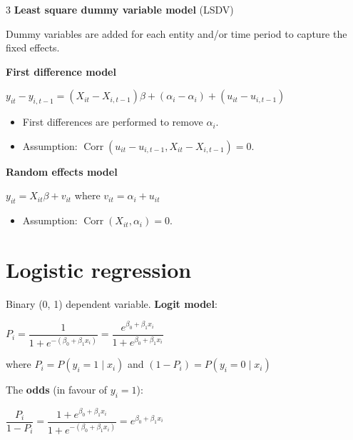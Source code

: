 \documentclass[10pt, a4paper, landscape]{article}
\DeclareMathOperator{\Corr}{Corr}
\begin{document}
\begin{multicols}{3}
\textbf{Least square dummy variable model} (LSDV)

Dummy variables are added for each entity and/or time period to capture the fixed effects.

\textbf{First difference model}

\begin{center}
	\( y_{it} - y_{i, t - 1} = (X_{it} - X_{i, t - 1}) \beta + (\alpha_{i} - \alpha_{i}) + (u_{it} - u_{i, t - 1}) \)
\end{center}

\begin{itemize}[leftmargin=*]
	\item First differences are performed to remove \( \alpha_{i} \).
	\item Assumption: \( \Corr(u_{it} - u_{i, t - 1}, X_{it} - X_{i, t - 1}) = 0 \).
\end{itemize}

\textbf{Random effects model}

\begin{center}
	\( y_{it} = X_{it} \beta + v_{it} \) where \( v_{it} = \alpha_{i} + u_{it} \)
\end{center}

\begin{itemize}[leftmargin=*]
	\item Assumption: \( \Corr(X_{it}, \alpha_i) = 0 \).
\end{itemize}

\section*{Logistic regression}

Binary (0, 1) dependent variable. \textbf{Logit model}:

\begin{center}
	\( P_{i} = \dfrac{1}{1 + e^{-(\beta_{0} + \beta_{1} x_{i})}}= \dfrac{e^{\beta_{0} + \beta_{1} x_{i}}}{1 + e^{\beta_{0} + \beta_{1} x_{i}}} \)
\end{center}

where \( P_{i} = P(y_{i} = 1 \mid x_{i}) \) and \( (1 - P_{i}) = P(y_{i} = 0 \mid x_{i}) \)

The \textbf{odds} (in favour of \( y_{i} = 1 \)):

\begin{center}
	\( \dfrac{P_{i}}{1 - P_{i}} = \dfrac{1 + e^{\beta_{0} + \beta_{1} x_{i}}}{1 + e^{-(\beta_{0} + \beta_{1} x_{i})}} = e^{\beta_{0} + \beta_{1} x_{i}} \)
\end{center}


\end{multicols}
\end{document}
